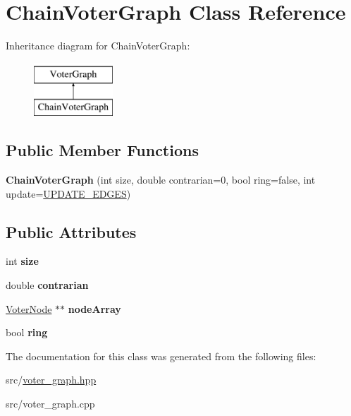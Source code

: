 \hypertarget{classChainVoterGraph}{\section{Chain\-Voter\-Graph Class Reference}
\label{classChainVoterGraph}
}
Inheritance diagram for Chain\-Voter\-Graph\-:\begin{figure}[H]
\begin{center}
\leavevmode
\includegraphics[height=2.000000cm]{classChainVoterGraph}
\end{center}
\end{figure}
\subsection*{Public Member Functions}
\begin{DoxyCompactItemize}
\item 
\hypertarget{classChainVoterGraph_af0e0e5327d26e67d46df0b33bb009c69}{{\bfseries Chain\-Voter\-Graph} (int size, double contrarian=0, bool ring=false, int update=\hyperlink{voter__graph_8hpp_ab3bec55c359e4ed771339c8bc61fc35aa01d100088352e1a7d3a34c9a66d0f951}{U\-P\-D\-A\-T\-E\-\_\-\-E\-D\-G\-E\-S})}\label{classChainVoterGraph_af0e0e5327d26e67d46df0b33bb009c69}

\end{DoxyCompactItemize}
\subsection*{Public Attributes}
\begin{DoxyCompactItemize}
\item 
\hypertarget{classChainVoterGraph_a03a3e2fb44bd8c4e0e1697545d4eff65}{int {\bfseries size}}\label{classChainVoterGraph_a03a3e2fb44bd8c4e0e1697545d4eff65}

\item 
\hypertarget{classChainVoterGraph_ace4b3a77876d38f216552e4b5bfaf32b}{double {\bfseries contrarian}}\label{classChainVoterGraph_ace4b3a77876d38f216552e4b5bfaf32b}

\item 
\hypertarget{classChainVoterGraph_a0b9e76e99e2666ca7e92ec757ce24d32}{\hyperlink{classVoterNode}{Voter\-Node} $\ast$$\ast$ {\bfseries node\-Array}}\label{classChainVoterGraph_a0b9e76e99e2666ca7e92ec757ce24d32}

\item 
\hypertarget{classChainVoterGraph_afb107128956fbedd499dfbfeef8fe14c}{bool {\bfseries ring}}\label{classChainVoterGraph_afb107128956fbedd499dfbfeef8fe14c}

\end{DoxyCompactItemize}


The documentation for this class was generated from the following files\-:\begin{DoxyCompactItemize}
\item 
src/\hyperlink{voter__graph_8hpp}{voter\-\_\-graph.\-hpp}\item 
src/voter\-\_\-graph.\-cpp\end{DoxyCompactItemize}
